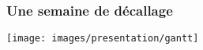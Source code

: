 \begin{frame}
	\frametitle{Une semaine de décallage}
	\hfill\texttt{[image: images/presentation/gantt]}\hfill\rule{0pt}{0pt}
\end{frame}